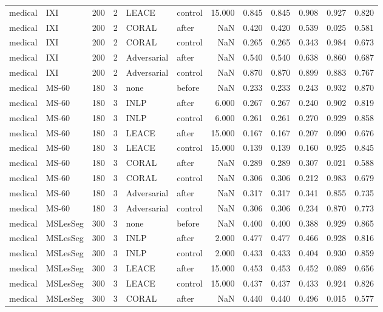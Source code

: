 \begin{tabular}{llrrllrrrrrr}
medical & IXI & 200 & 2 & LEACE & control & 15.000 & 0.845 & 0.845 & 0.908 & 0.927 & 0.820 \\
medical & IXI & 200 & 2 & CORAL & after & NaN & 0.420 & 0.420 & 0.539 & 0.025 & 0.581 \\
medical & IXI & 200 & 2 & CORAL & control & NaN & 0.265 & 0.265 & 0.343 & 0.984 & 0.673 \\
medical & IXI & 200 & 2 & Adversarial & after & NaN & 0.540 & 0.540 & 0.638 & 0.860 & 0.687 \\
medical & IXI & 200 & 2 & Adversarial & control & NaN & 0.870 & 0.870 & 0.899 & 0.883 & 0.767 \\
medical & MS-60 & 180 & 3 & none & before & NaN & 0.233 & 0.233 & 0.243 & 0.932 & 0.870 \\
medical & MS-60 & 180 & 3 & INLP & after & 6.000 & 0.267 & 0.267 & 0.240 & 0.902 & 0.819 \\
medical & MS-60 & 180 & 3 & INLP & control & 6.000 & 0.261 & 0.261 & 0.270 & 0.929 & 0.858 \\
medical & MS-60 & 180 & 3 & LEACE & after & 15.000 & 0.167 & 0.167 & 0.207 & 0.090 & 0.676 \\
medical & MS-60 & 180 & 3 & LEACE & control & 15.000 & 0.139 & 0.139 & 0.160 & 0.925 & 0.845 \\
medical & MS-60 & 180 & 3 & CORAL & after & NaN & 0.289 & 0.289 & 0.307 & 0.021 & 0.588 \\
medical & MS-60 & 180 & 3 & CORAL & control & NaN & 0.306 & 0.306 & 0.212 & 0.983 & 0.679 \\
medical & MS-60 & 180 & 3 & Adversarial & after & NaN & 0.317 & 0.317 & 0.341 & 0.855 & 0.735 \\
medical & MS-60 & 180 & 3 & Adversarial & control & NaN & 0.306 & 0.306 & 0.234 & 0.870 & 0.773 \\
medical & MSLesSeg & 300 & 3 & none & before & NaN & 0.400 & 0.400 & 0.388 & 0.929 & 0.865 \\
medical & MSLesSeg & 300 & 3 & INLP & after & 2.000 & 0.477 & 0.477 & 0.466 & 0.928 & 0.816 \\
medical & MSLesSeg & 300 & 3 & INLP & control & 2.000 & 0.433 & 0.433 & 0.404 & 0.930 & 0.859 \\
medical & MSLesSeg & 300 & 3 & LEACE & after & 15.000 & 0.453 & 0.453 & 0.452 & 0.089 & 0.656 \\
medical & MSLesSeg & 300 & 3 & LEACE & control & 15.000 & 0.437 & 0.437 & 0.433 & 0.924 & 0.826 \\
medical & MSLesSeg & 300 & 3 & CORAL & after & NaN & 0.440 & 0.440 & 0.496 & 0.015 & 0.577 \\

\end{tabular}
